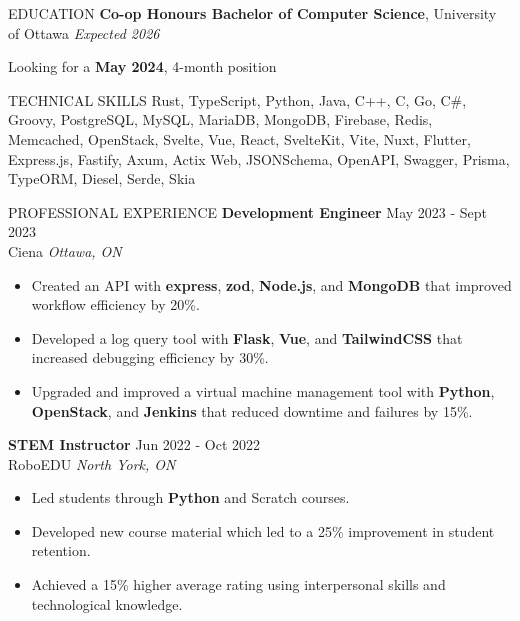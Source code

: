 \documentclass{resume}
\begin{document}
\color{primary}

\begin{rSection}{EDUCATION}
	{\textbf{Co-op Honours Bachelor of Computer Science}}, University of Ottawa \hfill \textit{Expected 2026}
	\begin{flushright}
		{Looking for a \textbf{May 2024}, 4-month position}
	\end{flushright}
\end{rSection}

\begin{rSection}{TECHNICAL SKILLS}
	Rust, TypeScript, Python, Java, C++, C, Go, C\#, Groovy, PostgreSQL, MySQL, MariaDB, MongoDB, Firebase, Redis, Memcached, OpenStack, Svelte, Vue, React, SvelteKit, Vite, Nuxt, Flutter, Express.js, Fastify, Axum, Actix Web, JSONSchema, OpenAPI, Swagger, Prisma, TypeORM, Diesel, Serde, Skia
\end{rSection}

\begin{rSection}{PROFESSIONAL EXPERIENCE}
	\textbf{Development Engineer} \hfill May 2023 - Sept 2023 \\ Ciena \hfill \textit{Ottawa, ON}

	\begin{itemize}
		\itemsep -3pt {}
		\item Created an API with \textbf{express}, \textbf{zod}, \textbf{Node.js}, and \textbf{MongoDB} that improved workflow efficiency by 20\%.
		\item Developed a log query tool with \textbf{Flask}, \textbf{Vue}, and \textbf{TailwindCSS} that increased debugging efficiency by 30\%.
		\item Upgraded and improved a virtual machine management tool with \textbf{Python}, \textbf{OpenStack}, and \textbf{Jenkins} that reduced downtime and failures by 15\%.
	\end{itemize}

	\textbf{STEM Instructor} \hfill Jun 2022 - Oct 2022 \\ RoboEDU \hfill \textit{North York, ON}

	\begin{itemize}
		\itemsep -3pt {}
		\item Led students through \textbf{Python} and Scratch courses.
		\item Developed new course material which led to a 25\% improvement in student retention.
		\item Achieved a 15\% higher average rating using interpersonal skills and technological knowledge.
	\end{itemize}
\end{rSection}
\end{document}
